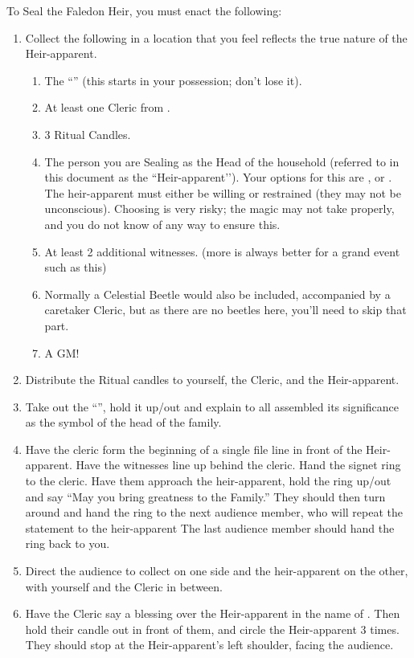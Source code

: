 \documentclass[green]{GL2020}
\begin{document}
To Seal the Faledon Heir, you must enact the following:
\begin{enumerate}
  \item Collect the following in a location that you feel reflects the true nature of the Heir-apparent.
    \begin{enumerate}
      \item The ``\iFaledonRing{}'' (this starts in your possession; don’t lose it).
      \item At least one Cleric from \pTech{}.
      \item 3 Ritual Candles.
      \item The person you are Sealing as the Head of the \cFaledonParent{\formal} household (referred to in this document as the ``Heir-apparent’’). Your options for this are \cHeir{}, or \cAmbition{}. The heir-apparent must either be willing or restrained (they may not be unconscious). Choosing \cAmbition{} is very risky; the magic may not take properly, and you do not know of any way to ensure this.
      \item At least 2 additional witnesses. (more is always better for a grand event such as this)
      \item Normally a Celestial Beetle would also be included, accompanied by a caretaker Cleric, but as there are no beetles here, you’ll need to skip that part.
      \item A GM!
    \end{enumerate}
  \item Distribute the Ritual candles to yourself, the Cleric, and the Heir-apparent.
  \item Take out the ``\iFaledonRing{}'', hold it up/out and explain to all assembled its significance as the symbol of the head of the \cFaledonParent{\formal} family.
  \item Have the cleric form the beginning of a single file line in front of the Heir-apparent. Have the witnesses line up behind the cleric. Hand the signet ring to the cleric. Have them approach the heir-apparent, hold the ring up/out and say ``May you bring greatness to the \cFaledonParent{\formal} Family.'' They should then turn around and hand the ring to the next audience member, who will repeat the statement to the heir-apparent The last audience member should hand the ring back to you.
  \item Direct the audience to collect on one side and the heir-apparent on the other, with yourself and the Cleric in between.
  \item Have the Cleric say a blessing over the Heir-apparent in the name of \cTechGod{}. Then hold their candle out in front of them, and circle the Heir-apparent 3 times. They should stop at the Heir-apparent’s left shoulder, facing the audience.

\end{enumerate}
\end{document}
